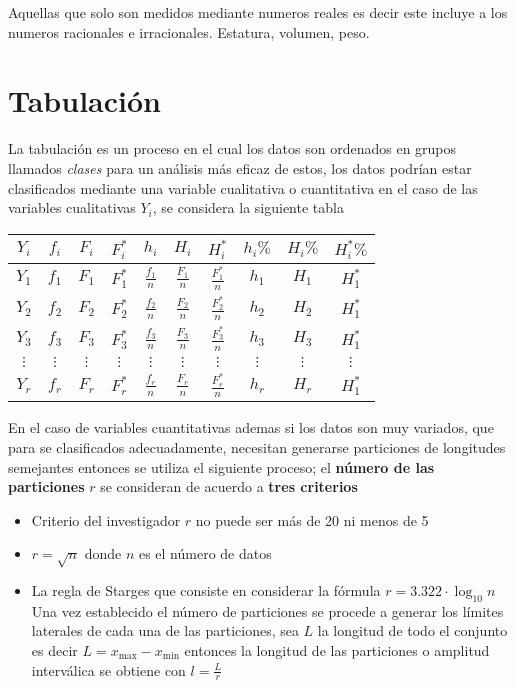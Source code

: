 \documentclass[10pt,]{krantz}
\theoremstyle{definition}
\theoremstyle{definition}
\theoremstyle{definition}
\theoremstyle{remark}
\begin{document}
Aquellas que solo son medidos mediante numeros reales es decir este incluye a los numeros racionales e irracionales. Estatura, volumen, peso.

\hypertarget{tabulaciuxf3n}{%
\chapter{Tabulación}\label{tabulaciuxf3n}}

La tabulación es un proceso en el cual los datos son ordenados en grupos llamados \emph{clases} para un análisis más eficaz de estos, los datos podrían estar clasificados mediante una variable cualitativa o cuantitativa en el caso de las variables cualitativas \(Y_i\), se considera la siguiente tabla

\begin{longtable}[]{@{}cccccccccc@{}}
\toprule
\(Y_i\) & \(f_i\) & \(F_i\) & \(F_i^*\) & \(h_i\) & \(H_i\) & \(H_i^*\) & \(h_i\%\) & \(H_i\%\) & \(H_i^*\%\)\tabularnewline
\midrule
\endhead
\(Y_1\) & \(f_1\) & \(F_1\) & \(F_1^*\) & \(\frac{f_1}{n}\) & \(\frac{F_1}{n}\) & \(\frac{F_1^*}{n}\) & \(h_1\) & \(H_1\) & \(H_1^*\)\tabularnewline
\(Y_2\) & \(f_2\) & \(F_2\) & \(F_2^*\) & \(\frac{f_2}{n}\) & \(\frac{F_2}{n}\) & \(\frac{F_2^*}{n}\) & \(h_2\) & \(H_2\) & \(H_1^*\)\tabularnewline
\(Y_3\) & \(f_3\) & \(F_3\) & \(F_3^*\) & \(\frac{f_3}{n}\) & \(\frac{F_3}{n}\) & \(\frac{F_3^*}{n}\) & \(h_3\) & \(H_3\) & \(H_1^*\)\tabularnewline
\(\vdots\) & \(\vdots\) & \(\vdots\) & \(\vdots\) & \(\vdots\) & \(\vdots\) & \(\vdots\) & \(\vdots\) & \(\vdots\) & \(\vdots\)\tabularnewline
\(Y_r\) & \(f_r\) & \(F_r\) & \(F_r^*\) & \(\frac{f_r}{n}\) & \(\frac{F_r}{n}\) & \(\frac{F_r^*}{n}\) & \(h_r\) & \(H_r\) & \(H_1^*\)\tabularnewline
\bottomrule
\end{longtable}

En el caso de variables cuantitativas ademas si los datos son muy variados, que para se clasificados adecuadamente, necesitan generarse particiones de longitudes semejantes entonces se utiliza el siguiente proceso; el \textbf{número de las particiones} \(r\) se consideran de acuerdo a \textbf{tres criterios}

\begin{itemize}
\item
  Criterio del investigador \(r\) no puede ser más de 20 ni menos de 5
\item
  \(r=\sqrt{n}\) donde \(n\) es el número de datos
\item
  La regla de Starges que consiste en considerar la fórmula \(r=3.322\cdot\log_{10} n\)
  Una vez establecido el número de particiones se procede a generar los límites laterales de cada una de las particiones, sea \(L\) la longitud de todo el conjunto es decir \(L=x_{\text{max}}-x_{\text{min}}\) entonces la longitud de las particiones o amplitud interválica se obtiene con \(l=\frac{L}{r}\)
\end{itemize}
\end{document}
